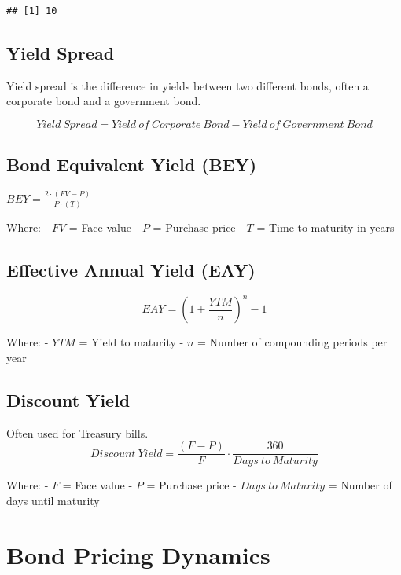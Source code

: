 \documentclass[
]{book}
\begin{document}
\begin{verbatim}
## [1] 10
\end{verbatim}

\hypertarget{yield-spread}{%
\subsection{Yield Spread}\label{yield-spread}}

Yield spread is the difference in yields between two different bonds,
often a corporate bond and a government bond.

\[
Yield\ Spread = Yield\ of\ Corporate\ Bond - Yield\ of\ Government\ Bond
\]

\hypertarget{bond-equivalent-yield-bey}{%
\subsection{Bond Equivalent Yield
(BEY)}\label{bond-equivalent-yield-bey}}

\(BEY = \frac{2 \cdot (FV - P)}{P \cdot (T)}\)

Where: - \(FV\) = Face value - \(P\) = Purchase price - \(T\) = Time to
maturity in years

\hypertarget{effective-annual-yield-eay}{%
\subsection{Effective Annual Yield
(EAY)}\label{effective-annual-yield-eay}}

\[EAY = \left(1 + \frac{YTM}{n}\right)^n - 1\]

Where: - \(YTM\) = Yield to maturity - \(n\) = Number of compounding
periods per year

\hypertarget{discount-yield}{%
\subsection{Discount Yield}\label{discount-yield}}

Often used for Treasury bills.
\[Discount\ Yield = \frac{(F - P)}{F} \cdot \frac{360}{Days\ to\ Maturity}\]

Where: - \(F\) = Face value - \(P\) = Purchase price -
\(Days\ to\ Maturity\) = Number of days until maturity

\hypertarget{bond-pricing-dynamics}{%
\section{Bond Pricing Dynamics}\label{bond-pricing-dynamics}}
\end{document}
